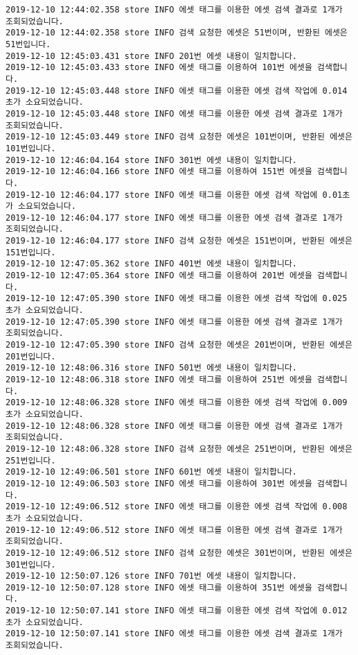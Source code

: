 \begin{Verbatim}[fontsize=\tiny, breaklines=true, breakanywhere=true]
2019-12-10 12:44:02.358 store INFO 에셋 태그를 이용한 에셋 검색 결과로 1개가 조회되었습니다.
2019-12-10 12:44:02.358 store INFO 검색 요청한 에셋은 51번이며, 반환된 에셋은 51번입니다.
2019-12-10 12:45:03.431 store INFO 201번 에셋 내용이 일치합니다.
2019-12-10 12:45:03.433 store INFO 에셋 태그를 이용하여 101번 에셋을 검색합니다.
2019-12-10 12:45:03.448 store INFO 에셋 태그를 이용한 에셋 검색 작업에 0.014초가 소요되었습니다.
2019-12-10 12:45:03.448 store INFO 에셋 태그를 이용한 에셋 검색 결과로 1개가 조회되었습니다.
2019-12-10 12:45:03.449 store INFO 검색 요청한 에셋은 101번이며, 반환된 에셋은 101번입니다.
2019-12-10 12:46:04.164 store INFO 301번 에셋 내용이 일치합니다.
2019-12-10 12:46:04.166 store INFO 에셋 태그를 이용하여 151번 에셋을 검색합니다.
2019-12-10 12:46:04.177 store INFO 에셋 태그를 이용한 에셋 검색 작업에 0.01초가 소요되었습니다.
2019-12-10 12:46:04.177 store INFO 에셋 태그를 이용한 에셋 검색 결과로 1개가 조회되었습니다.
2019-12-10 12:46:04.177 store INFO 검색 요청한 에셋은 151번이며, 반환된 에셋은 151번입니다.
2019-12-10 12:47:05.362 store INFO 401번 에셋 내용이 일치합니다.
2019-12-10 12:47:05.364 store INFO 에셋 태그를 이용하여 201번 에셋을 검색합니다.
2019-12-10 12:47:05.390 store INFO 에셋 태그를 이용한 에셋 검색 작업에 0.025초가 소요되었습니다.
2019-12-10 12:47:05.390 store INFO 에셋 태그를 이용한 에셋 검색 결과로 1개가 조회되었습니다.
2019-12-10 12:47:05.390 store INFO 검색 요청한 에셋은 201번이며, 반환된 에셋은 201번입니다.
2019-12-10 12:48:06.316 store INFO 501번 에셋 내용이 일치합니다.
2019-12-10 12:48:06.318 store INFO 에셋 태그를 이용하여 251번 에셋을 검색합니다.
2019-12-10 12:48:06.328 store INFO 에셋 태그를 이용한 에셋 검색 작업에 0.009초가 소요되었습니다.
2019-12-10 12:48:06.328 store INFO 에셋 태그를 이용한 에셋 검색 결과로 1개가 조회되었습니다.
2019-12-10 12:48:06.328 store INFO 검색 요청한 에셋은 251번이며, 반환된 에셋은 251번입니다.
2019-12-10 12:49:06.501 store INFO 601번 에셋 내용이 일치합니다.
2019-12-10 12:49:06.503 store INFO 에셋 태그를 이용하여 301번 에셋을 검색합니다.
2019-12-10 12:49:06.512 store INFO 에셋 태그를 이용한 에셋 검색 작업에 0.008초가 소요되었습니다.
2019-12-10 12:49:06.512 store INFO 에셋 태그를 이용한 에셋 검색 결과로 1개가 조회되었습니다.
2019-12-10 12:49:06.512 store INFO 검색 요청한 에셋은 301번이며, 반환된 에셋은 301번입니다.
2019-12-10 12:50:07.126 store INFO 701번 에셋 내용이 일치합니다.
2019-12-10 12:50:07.128 store INFO 에셋 태그를 이용하여 351번 에셋을 검색합니다.
2019-12-10 12:50:07.141 store INFO 에셋 태그를 이용한 에셋 검색 작업에 0.012초가 소요되었습니다.
2019-12-10 12:50:07.141 store INFO 에셋 태그를 이용한 에셋 검색 결과로 1개가 조회되었습니다.

\end{Verbatim}
